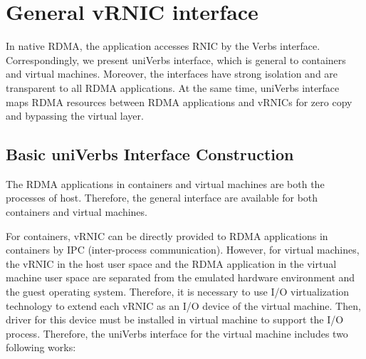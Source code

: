 \section{General vRNIC interface}
In native RDMA, the application accesses RNIC by the Verbs interface. Correspondingly, we present uniVerbs interface, which is general to containers and virtual machines. Moreover, the interfaces have strong isolation and are transparent to all RDMA applications. At the same time, uniVerbs interface maps RDMA resources between RDMA applications and vRNICs for zero copy and bypassing the virtual layer.

\subsection{Basic uniVerbs Interface Construction}
The RDMA applications in containers and virtual machines are both the processes of host. Therefore, the general interface are available for both containers and virtual machines. 

For containers, vRNIC can be directly provided to RDMA applications in containers by IPC (inter-process communication). However, for virtual machines, the vRNIC in the host user space and the RDMA application in the virtual machine user space are separated from the emulated hardware environment and the guest operating system. Therefore, it is necessary to use I/O virtualization technology to extend each vRNIC as an I/O device of the virtual machine. Then, driver for this device must be installed in virtual machine to support the I/O process. Therefore, the uniVerbs interface for the virtual machine includes two following works:

